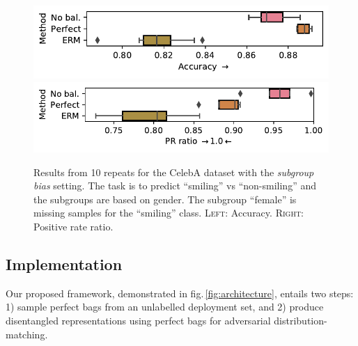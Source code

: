 \begin{figure}[ht]
  \centering
  \includegraphics[width=\columnwidth]{paper3/figures/celeba_gender_smiling_acc.pdf}
  \includegraphics[width=\columnwidth]{paper3/figures/celeba_gender_smiling_prr.pdf}
  \caption{
    Results from 10 repeats for the CelebA dataset with the \emph{subgroup bias} setting.
    The task is to predict ``smiling'' vs ``non-smiling'' and the subgroups are based on gender.
    The subgroup ``female'' is missing samples for the ``smiling'' class.
    \textsc{Left}: Accuracy.
    \textsc{Right}: Positive rate ratio.
  }%
  \label{fig:celeba-gender-smiling}
\end{figure}

\subsection{Implementation}
\label{sec:implementation}
Our proposed framework, demonstrated in fig.\,\ref{fig:architecture}, entails two steps: 1) sample perfect bags from an unlabelled deployment set, and 2) produce disentangled representations using perfect bags for adversarial distribution-matching.

